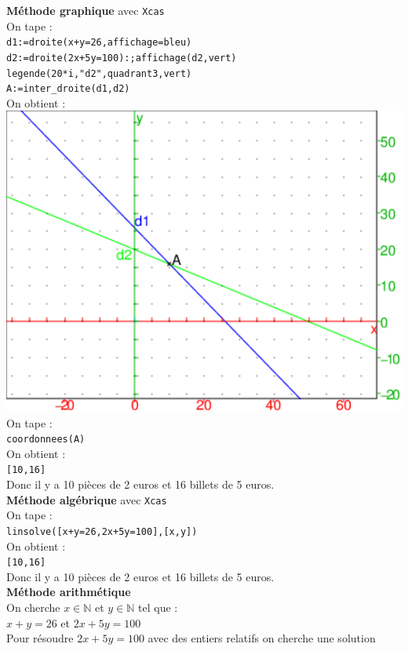 \documentclass[a4paper,11pt]{book}
\newcommand{\N}{{\mathbb{N}}}
\begin{document}
\begin{enumerate}
{\bf M\'ethode graphique} avec {\tt Xcas}\\
On tape :\\
{\tt d1:=droite(x+y=26,affichage=bleu)}\\
{\tt d2:=droite(2x+5y=100):;affichage(d2,vert)}\\
{\tt legende(20*i,"d2",quadrant3,vert)}\\
{\tt A:=inter\_droite(d1,d2)}\\
On obtient :\\
\includegraphics[width=\textwidth]{systgraph1}\\
On tape :\\
{\tt coordonnees(A)}\\
On obtient :\\
{\tt [10,16]}\\
Donc il y a 10 pi\`eces de 2 euros et 16 billets de 5 euros.\\
{\bf M\'ethode alg\'ebrique} avec {\tt Xcas}\\
On tape :\\
{\tt linsolve([x+y=26,2x+5y=100],[x,y])}\\
On obtient :\\
{\tt [10,16]}\\
Donc il y a 10 pi\`eces de 2 euros et 16 billets de 5 euros.\\
{\bf M\'ethode arithm\'etique}\\ 
On cherche $x \in \N$ et $y \in \N$ tel que :\\
$x+y=26$ et $2x+5y=100$\\
Pour r\'esoudre $2x+5y=100$ avec des entiers relatifs on cherche une solution 

\end{enumerate}
\end{document}
